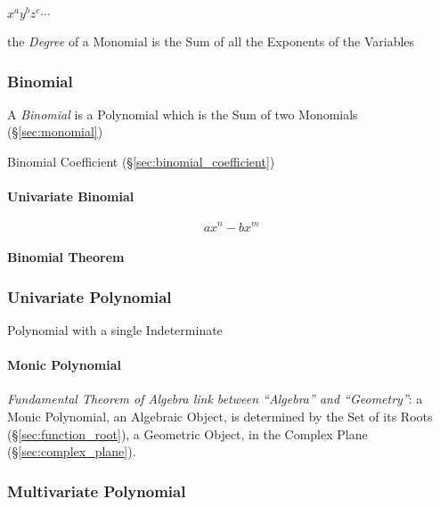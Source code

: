 $x^a y^b z^c \cdots$

the \emph{Degree} of a Monomial is the Sum of all the Exponents of the
Variables



\subsubsection{Binomial}\label{sec:binomial}

A \emph{Binomial} is a Polynomial which is the Sum of two Monomials
(\S\ref{sec:monomial})

Binomial Coefficient (\S\ref{sec:binomial_coefficient})



\paragraph{Univariate Binomial}\label{sec:univariate_binomial}\hfill

\[
  a x^n - b x^m
\]


\paragraph{Binomial Theorem}\label{sec:binomial_theorem}\hfill



\subsubsection{Univariate Polynomial}\label{sec:univariate_polynomial}

Polynomial with a single Indeterminate



\paragraph{Monic Polynomial}\label{sec:monic_polynomial}\hfill

\emph{Fundamental Theorem of Algebra link between ``Algebra'' and
  ``Geometry''}: a Monic Polynomial, an Algebraic Object, is determined by the
Set of its Roots (\S\ref{sec:function_root}), a Geometric Object, in the
Complex Plane (\S\ref{sec:complex_plane}).



\subsubsection{Multivariate Polynomial}\label{sec:multivariate_polynomial}

